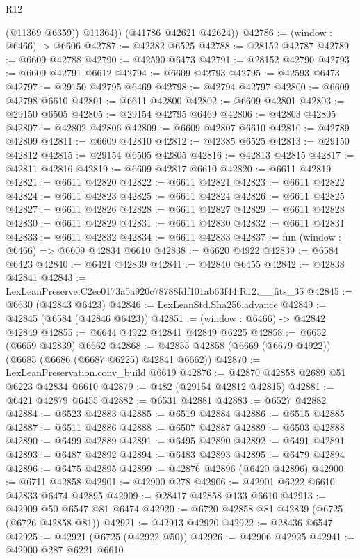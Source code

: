 \begin{lexlean}{R12}
\begin{coremodule}
            (@11369 @6359))
          @11364))
      (@41786 @42621 @42624))
@42786 := (window : @6466) -> @6606
@42787 := @42382 @6525
@42788 := @28152 @42787
@42789 := @6609 @42788
@42790 := @42590 @6473
@42791 := @28152 @42790
@42793 := @6609 @42791 @6612
@42794 := @6609 @42793
@42795 := @42593 @6473
@42797 := @29150 @42795 @6469
@42798 := @42794 @42797
@42800 := @6609 @42798 @6610
@42801 := @6611 @42800
@42802 := @6609 @42801
@42803 := @29150 @6505
@42805 := @29154 @42795 @6469
@42806 := @42803 @42805
@42807 := @42802 @42806
@42809 := @6609 @42807 @6610
@42810 := @42789 @42809
@42811 := @6609 @42810
@42812 := @42385 @6525
@42813 := @29150 @42812
@42815 := @29154 @6505 @42805
@42816 := @42813 @42815
@42817 := @42811 @42816
@42819 := @6609 @42817 @6610
@42820 := @6611 @42819
@42821 := @6611 @42820
@42822 := @6611 @42821
@42823 := @6611 @42822
@42824 := @6611 @42823
@42825 := @6611 @42824
@42826 := @6611 @42825
@42827 := @6611 @42826
@42828 := @6611 @42827
@42829 := @6611 @42828
@42830 := @6611 @42829
@42831 := @6611 @42830
@42832 := @6611 @42831
@42833 := @6611 @42832
@42834 := @6611 @42833
@42837 := fun (window : @6466) => @6609 @42834 @6610
@42838 := @6620 @4922
@42839 := @6584 @6423
@42840 := @6421 @42839
@42841 := @42840 @6455
@42842 := @42838 @42841
@42843 := LexLeanPreserve.C2ee0173a5a920c78788fdf101ab63f44.R12.__fits_35
@42845 := @6630 (@42843 @6423)
@42846 := LexLeanStd.Sha256.advance
@42849 := @42845 (@6584 (@42846 @6423))
@42851 := (window : @6466) -> @42842 @42849
@42855 := @6644 @4922 @42841 @42849 @6225
@42858 := @6652 (@6659 @42839) @6662
@42868 := @42855 @42858 (@6669 (@6679 @4922)) (@6685 (@6686 (@6687 @6225) @42841 @6662))
@42870 := LexLeanPreservation.conv_build @6619
@42876 := @42870 @42858 @2689 @51 @6223 @42834 @6610
@42879 := @482 (@29154 @42812 @42815)
@42881 := @6421 @42879 @6455
@42882 := @6531 @42881
@42883 := @6527 @42882
@42884 := @6523 @42883
@42885 := @6519 @42884
@42886 := @6515 @42885
@42887 := @6511 @42886
@42888 := @6507 @42887
@42889 := @6503 @42888
@42890 := @6499 @42889
@42891 := @6495 @42890
@42892 := @6491 @42891
@42893 := @6487 @42892
@42894 := @6483 @42893
@42895 := @6479 @42894
@42896 := @6475 @42895
@42899 := @42876 @42896 (@6420 @42896)
@42900 := @6711 @42858
@42901 := @42900 @278
@42906 := @42901 @6222 @6610 @42833 @6474 @42895
@42909 := @28417 @42858 @133 @6610
@42913 := @42909 @50 @6547 @81 @6474
@42920 := @6720 @42858 @81 @42839 (@6725 (@6726 @42858 @81))
@42921 := @42913 @42920
@42922 := @28436 @6547
@42925 := @42921 (@6725 (@42922 @50))
@42926 := @42906 @42925
@42941 := @42900
    @287
    @6221
    @6610

\end{coremodule}
\end{lexlean}
